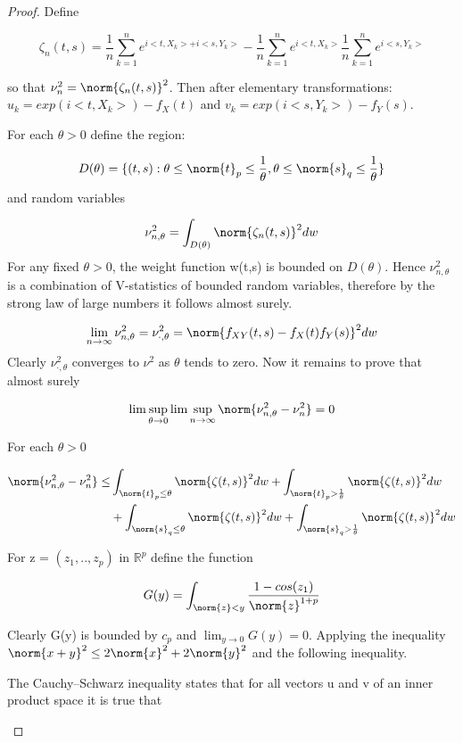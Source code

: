 \begin{proof}
Define 

$$
\zeta_{n}(t,s) = \frac{1}{n}\sum_{k=1}^{n}e^{i<t,X_{k}>+i<s,Y_{k}>}- \frac{1}{n}\sum_{k=1}^{n}e^{i<t,X_{k}>}\frac{1}{n}\sum_{k=1}^{n}e^{i<s,Y_{k}>}
$$

so that $\nu^{2}_{n} = \norm{\zeta_{n}(t,s)}^{2}$. Then after elementary transformations: $u_{k} = exp(i<t,X_{k}>)-f_{X}(t)$ and $v_{k} = exp(i<s,Y_{k}>)-f_{Y}(s)$.

For each $\theta>0$ define the region:

$$
D(\theta) = \{(t,s):\theta\leq\norm{t}_{p}\leq\frac{1}{\theta}, \theta\leq\norm{s}_{q}\leq\frac{1}{\theta}\}
$$ 
and random variables 

$$
\nu^{2}_{n,\theta} = \int_{D(\theta)}\norm{\zeta_{n}(t,s)}^{2}dw
$$
For any fixed $\theta>0$, the weight function w(t,s) is bounded on $D(\theta)$. Hence $\nu^{2}_{n,\theta}$ is a combination of V-statistics of bounded random variables, therefore by the strong law of large numbers
it follows almost surely.

$$
\lim_{n\to\infty}\nu^{2}_{n,\theta} = \nu^{2}_{\cdot,\theta} = \norm{f_{XY}(t,s) - f_{X}(t)f_{Y}(s)}^{2}dw
$$
Clearly $\nu^{2}_{\cdot,\theta}$ converges to $\nu^{2}$ as $\theta$ tends to zero. Now it remains to prove that almost surely

$$
\lim\sup_{\theta \to 0} \lim\sup_{n \to \infty} \norm{\nu^{2}_{n,\theta}-\nu^{2}_{n}} = 0
$$

For each $\theta>0$

\begin{equation}{}
\begin{split}
\norm{\nu^{2}_{n,\theta} - \nu^{2}_{n}} \leq &
\int_{\norm{t}_{p}\leq\theta}\norm{\zeta(t,s)}^{2}dw + \int_{\norm{t}_{p}>\frac{1}{\theta}}\norm{\zeta(t,s)}^{2}dw \\
& + \int_{\norm{s}_{q}\leq\theta}\norm{\zeta(t,s)}^{2}dw + \int_{\norm{s}_{q}>\frac{1}{\theta}}\norm{\zeta(t,s)}^{2}dw
\end{split}
\end{equation}\label{asymptotic_inequality}

For z = $(z_{1},..,z_{p})$ in $\mathbb{R}^{p}$ define the function

$$
G(y) = \int_{\norm{z}<y} \frac{1-cos(z_{1})}{\norm{z}^{1+p}}
$$

Clearly G(y) is bounded by $c_{p}$ and $\lim_{y\to0}G(y) = 0$. Applying the inequality $\norm{x+y}^{2}\leq2\norm{x}^{2}+2\norm{y}^{2}$ and the following inequality.
\begin{prop}
The Cauchy–Schwarz inequality states that for all vectors u and v of an inner product space it is true that


\end{prop}
\end{proof}
